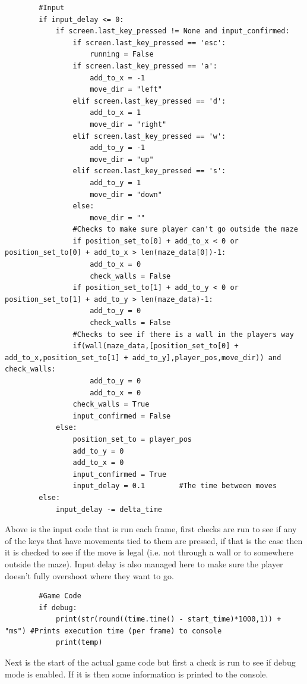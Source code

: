 \clearpage
\begin{lstlisting}
        #Input
        if input_delay <= 0:
            if screen.last_key_pressed != None and input_confirmed:
                if screen.last_key_pressed == 'esc':
                    running = False
                if screen.last_key_pressed == 'a':
                    add_to_x = -1
                    move_dir = "left"
                elif screen.last_key_pressed == 'd':
                    add_to_x = 1
                    move_dir = "right"
                elif screen.last_key_pressed == 'w':
                    add_to_y = -1
                    move_dir = "up"
                elif screen.last_key_pressed == 's':
                    add_to_y = 1
                    move_dir = "down"
                else:
                    move_dir = ""
                #Checks to make sure player can't go outside the maze
                if position_set_to[0] + add_to_x < 0 or position_set_to[0] + add_to_x > len(maze_data[0])-1:
                    add_to_x = 0
                    check_walls = False
                if position_set_to[1] + add_to_y < 0 or position_set_to[1] + add_to_y > len(maze_data)-1:
                    add_to_y = 0
                    check_walls = False
                #Checks to see if there is a wall in the players way
                if(wall(maze_data,[position_set_to[0] + add_to_x,position_set_to[1] + add_to_y],player_pos,move_dir)) and check_walls:
                    add_to_y = 0
                    add_to_x = 0
                check_walls = True
                input_confirmed = False
            else:
                position_set_to = player_pos
                add_to_y = 0
                add_to_x = 0
                input_confirmed = True
                input_delay = 0.1        #The time between moves
        else:
            input_delay -= delta_time
\end{lstlisting}
Above is the input code that is run each frame, first checks are run to see if any of the keys that have movements tied to them are pressed, if that is the case then it is checked to see if the move is legal (i.e. not through a wall or to somewhere outside the maze). Input delay is also managed here to make sure the player doesn't fully overshoot where they want to go.

\begin{lstlisting}
        #Game Code
        if debug:
            print(str(round((time.time() - start_time)*1000,1)) + "ms") #Prints execution time (per frame) to console
            print(temp)
\end{lstlisting}
Next is the start of the actual game code but first a check is run to see if debug mode is enabled. If it is then some information is printed to the console.

